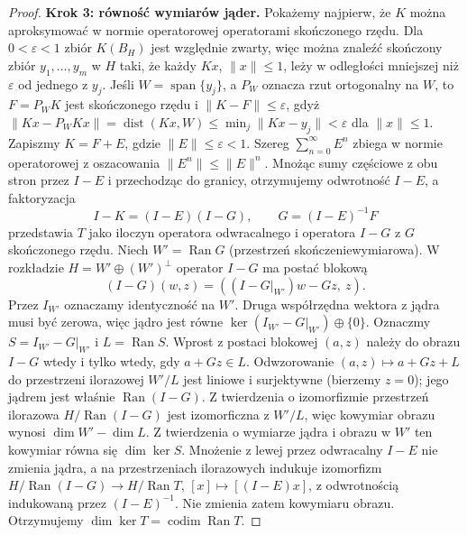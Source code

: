 \begin{proof}
\textbf{Krok 3: równość wymiarów jąder.}
Pokażemy najpierw, że $K$ można aproksymować
w normie operatorowej operatorami skończonego rzędu.
Dla $0<\varepsilon<1$ zbiór $K(B_H)$ jest względnie
zwarty, więc można znaleźć skończony zbiór
$y_1,\dots,y_m$ w $H$ taki, że każdy $Kx$, $\|x\|\le1$,
leży w odległości mniejszej niż $\varepsilon$ od
jednego z $y_j$. Jeśli $W=\operatorname{span}\{y_j\}$,
a $P_W$ oznacza rzut ortogonalny na $W$, to
$F=P_WK$ jest skończonego rzędu i
$\|K-F\|\le\varepsilon$, gdyż
$\|Kx-P_WKx\|=\operatorname{dist}(Kx,W)
\le\min_j\|Kx-y_j\|<\varepsilon$ dla $\|x\|\le1$.
Zapiszmy $K=F+E$, gdzie $\|E\|\le\varepsilon<1$.
Szereg $\sum_{n=0}^\infty E^n$ zbiega w normie operatorowej
z oszacowania $\|E^n\|\le\|E\|^n$.
Mnożąc sumy częściowe z obu stron przez $I-E$
i przechodząc do granicy, otrzymujemy odwrotność $I-E$,
a faktoryzacja
\[
I-K=(I-E)(I-G),\qquad G=(I-E)^{-1}F
\]
przedstawia $T$ jako iloczyn operatora odwracalnego
i operatora $I-G$ z $G$ skończonego rzędu.
Niech $W'=\operatorname{Ran}G$ (przestrzeń skończeniewymiarowa).
W rozkładzie $H=W'\oplus(W')^\perp$ operator $I-G$
ma postać blokową
\[
(I-G)(w,z)=((I-G|_{W'})w-Gz,\ z).
\]
Przez $I_{W'}$ oznaczamy identyczność na $W'$.
Druga współrzędna wektora z jądra musi być zerowa,
więc jądro jest równe
$\ker(I_{W'}-G|_{W'})\oplus\{0\}$.
Oznaczmy $S=I_{W'}-G|_{W'}$ i $L=\operatorname{Ran}S$.
Wprost z postaci blokowej $(a,z)$ należy do obrazu
$I-G$ wtedy i tylko wtedy, gdy $a+Gz\in L$.
Odwzorowanie $(a,z)\mapsto a+Gz+L$ do przestrzeni
ilorazowej $W'/L$ jest liniowe i surjektywne
(bierzemy $z=0$); jego jądrem jest właśnie
$\operatorname{Ran}(I-G)$. Z twierdzenia o izomorfizmie
przestrzeń ilorazowa $H/\operatorname{Ran}(I-G)$
jest izomorficzna z $W'/L$, więc kowymiar obrazu
wynosi $\dim W'-\dim L$.
Z twierdzenia o wymiarze jądra i obrazu w $W'$
ten kowymiar równa się $\dim\ker S$.
Mnożenie z lewej przez odwracalny $I-E$ nie zmienia
jądra, a na przestrzeniach ilorazowych indukuje izomorfizm
$H/\operatorname{Ran}(I-G)\to H/\operatorname{Ran}T$,
$[x]\mapsto[(I-E)x]$, z odwrotnością indukowaną przez
$(I-E)^{-1}$. Nie zmienia zatem kowymiaru obrazu. Otrzymujemy
$\dim\ker T=\operatorname{codim}\operatorname{Ran}T$.


\end{proof}
